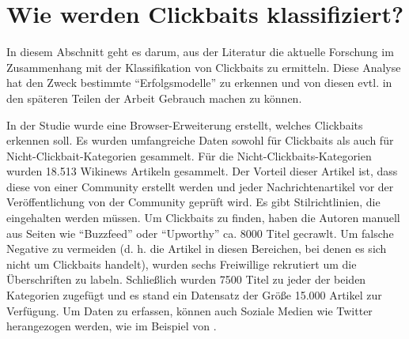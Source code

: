 \section{Wie werden Clickbaits klassifiziert?}

In diesem Abschnitt geht es darum, aus der Literatur die aktuelle Forschung im Zusammenhang mit der Klassifikation von Clickbaits zu ermitteln. Diese Analyse hat den Zweck bestimmte \enquote{Erfolgsmodelle} zu erkennen und von diesen evtl. in den späteren Teilen der Arbeit Gebrauch machen zu können.

In der Studie \cite*{Chakrabortya} wurde eine Browser-Erweiterung erstellt, welches Clickbaits erkennen soll. Es wurden umfangreiche Daten sowohl für Clickbaits als auch für Nicht-Clickbait-Kategorien gesammelt. Für die Nicht-Clickbaits-Kategorien wurden 18.513 Wikinews Artikeln gesammelt. Der Vorteil dieser Artikel ist, dass diese von einer Community erstellt werden und jeder Nachrichtenartikel vor der Veröffentlichung von der Community geprüft wird. Es gibt Stilrichtlinien, die eingehalten werden müssen. Um Clickbaits zu finden, haben die Autoren manuell aus Seiten wie \enquote{Buzzfeed} oder \enquote{Upworthy} ca. 8000 Titel gecrawlt. Um falsche Negative zu vermeiden (d. h. die Artikel in diesen Bereichen, bei denen es sich nicht um Clickbaits handelt), wurden sechs Freiwillige rekrutiert um die Überschriften zu labeln. Schließlich wurden 7500 Titel zu jeder der beiden Kategorien zugefügt und es stand ein Datensatz der Größe 15.000 Artikel zur Verfügung. Um Daten zu erfassen, können auch Soziale Medien wie Twitter herangezogen werden, wie im Beispiel von \cite*{Potthast}.



